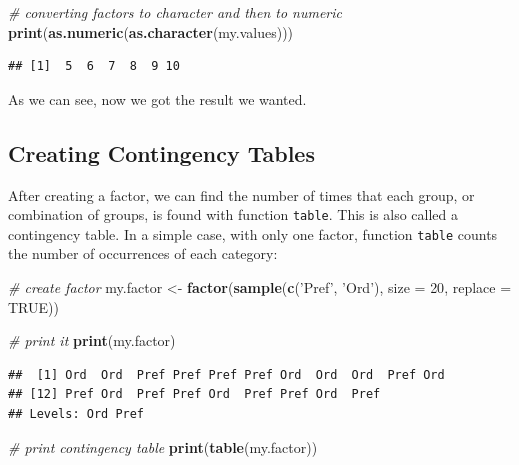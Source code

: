 \documentclass[11pt,]{book}
\newenvironment{Shaded}{\begin{snugshade}}{\end{snugshade}}
\newcommand{\KeywordTok}[1]{\textcolor[rgb]{0.27,0.27,0.27}{\textbf{#1}}}
\newcommand{\DataTypeTok}[1]{\textcolor[rgb]{0.27,0.27,0.27}{#1}}
\newcommand{\DecValTok}[1]{\textcolor[rgb]{0.06,0.06,0.06}{#1}}
\newcommand{\StringTok}[1]{\textcolor[rgb]{0.5,0.5,0.5}{#1}}
\newcommand{\CommentTok}[1]{\textcolor[rgb]{0.56,0.35,0.01}{\textit{#1}}}
\newcommand{\OtherTok}[1]{\textcolor[rgb]{0.56,0.35,0.01}{#1}}
\newcommand{\NormalTok}[1]{#1}
\begin{document}
\begin{Shaded}
\begin{Highlighting}[]
\CommentTok{# converting factors to character and then to numeric}
\KeywordTok{print}\NormalTok{(}\KeywordTok{as.numeric}\NormalTok{(}\KeywordTok{as.character}\NormalTok{(my.values)))}
\end{Highlighting}
\end{Shaded}

\begin{verbatim}
## [1]  5  6  7  8  9 10
\end{verbatim}

As we can see, now we got the result we wanted.

\subsection{Creating Contingency
Tables}\label{creating-contingency-tables}

After creating a factor, we can find the number of times that each
group, or combination of groups, is found with function \texttt{table}.
This is also called a contingency table. In a simple case, with only one
factor, function \texttt{table} counts the number of occurrences of each
category: 

\begin{Shaded}
\begin{Highlighting}[]
\CommentTok{# create factor}
\NormalTok{my.factor <-}\StringTok{ }\KeywordTok{factor}\NormalTok{(}\KeywordTok{sample}\NormalTok{(}\KeywordTok{c}\NormalTok{(}\StringTok{'Pref'}\NormalTok{, }\StringTok{'Ord'}\NormalTok{), }
                             \DataTypeTok{size =} \DecValTok{20}\NormalTok{, }
                             \DataTypeTok{replace =} \OtherTok{TRUE}\NormalTok{))}
                             
\CommentTok{# print it }
\KeywordTok{print}\NormalTok{(my.factor)}
\end{Highlighting}
\end{Shaded}

\begin{verbatim}
##  [1] Ord  Ord  Pref Pref Pref Pref Ord  Ord  Ord  Pref Ord 
## [12] Pref Ord  Pref Pref Ord  Pref Pref Ord  Pref
## Levels: Ord Pref
\end{verbatim}

\begin{Shaded}
\begin{Highlighting}[]
\CommentTok{# print contingency table}
\KeywordTok{print}\NormalTok{(}\KeywordTok{table}\NormalTok{(my.factor))}
\end{Highlighting}
\end{Shaded}
\end{document}
